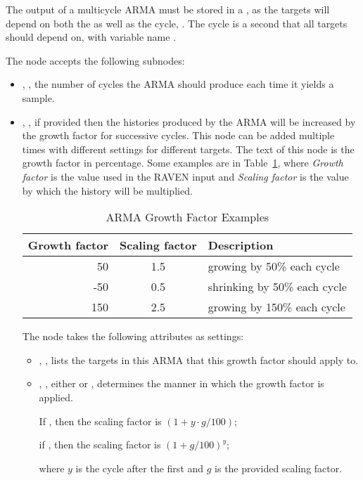 \begin{itemize}
    \nb The output of a multicycle ARMA must be stored in a , as the targets will depend
      on both the  as well as the cycle, . The cycle is a second
       that all targets should depend on, with variable name .

    The  node accepts the following subnodes:
    \begin{itemize}
      \item {}, , the number of cycles the ARMA should produce
        each time it yields a sample.
      \item {}, , if provided then the histories produced by
        the ARMA will be increased by the growth factor for successive cycles. This node can be added
        multiple times with different settings for different targets.
        The text of this node is the growth factor in percentage. Some examples are in
        Table~\ref{tab:arma multicycle growth}, where \emph{Growth factor} is the value used in the RAVEN
        input and \emph{Scaling factor} is the value by which the history will be multiplied.
        \begin{table}[h!]
          \centering
          \begin{tabular}{r c l}
            Growth factor & Scaling factor & Description \\ \hline
            50 & 1.5 & growing by 50\% each cycle \\
            -50 & 0.5 & shrinking by 50\% each cycle \\
            150 & 2.5 & growing by 150\% each cycle \\
          \end{tabular}
          \caption{ARMA Growth Factor Examples}
          \label{tab:arma multicycle growth}
        \end{table}

        The  node takes the following attributes as settings:
        \begin{itemize}
          \item {}, , lists the targets
            in this ARMA that this growth factor should apply to.
          \item {}, , either  or
            , determines the manner in which the growth factor is applied.

            If , then the scaling factor is $(1+y\cdot g/100)$;

            if , then the scaling factor is $(1+g/100)^y$;

            where $y$ is the cycle after the first and $g$ is the provided scaling factor.
        \end{itemize}
    \end{itemize}
    \romClusterOption
\end{itemize}

